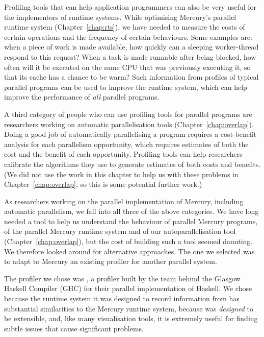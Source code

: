 Profiling tools that can help application programmers
can also be very useful for the implementors of runtime systems.
While optimising Mercury's parallel runtime system (Chapter~\ref{chap:rts}),
we have needed to measure the costs of certain operations
and the frequency of certain behaviours.
Some examples are:
when a piece of work is made available,
how quickly can a sleeping worker-thread respond to this request?
When a task is made runnable after being blocked,
how often will it be executed on the same CPU that was previously executing it,
so that its cache has a chance to be warm?
Such information from profiles of typical parallel programs
can be used to improve the runtime system,
which can help improve the performance of \emph{all} parallel programs.

A third category of people who can use profiling tools for parallel programs
are researchers working on automatic parallelisation tools
(Chapter~\ref{chap:overlap}).
Doing a good job of automatically parallelising a program
requires a cost-benefit analysis for each parallelism opportunity,
which requires estimates of both the cost and the benefit of each opportunity.
Profiling tools can help researchers calibrate
the algorithms they use to generate estimates of both costs and benefits.
(We did not use the work in this chapter to help us with these problems in
Chapter~\ref{chap:overlap},
so this is some potential further work.)

As researchers working on the parallel implementation of Mercury,
including automatic parallelism,
we fall into all three of the above categories.
We have long needed a tool
to help us understand the behaviour of parallel Mercury programs,
of the parallel Mercury runtime system
and of our autoparallelisation tool (Chapter~\ref{chap:overlap}),
but the cost of building such a tool seemed daunting.
We therefore looked around for alternative approaches.
The one we selected was to adapt to Mercury
an existing profiler for another parallel system.

The profiler we chose was \tscope \citep{threadscope},
a profiler built by the team behind the Glasgow Haskell Compiler (GHC)
for their parallel implementation of Haskell.
We chose \tscope because
the runtime system it was designed to record information from
has substantial similarities to the Mercury runtime system,
because \tscope was \emph{designed} to be extensible,
and, like many visualisation tools, it is extremely useful
for finding subtle issues that cause significant problems.

